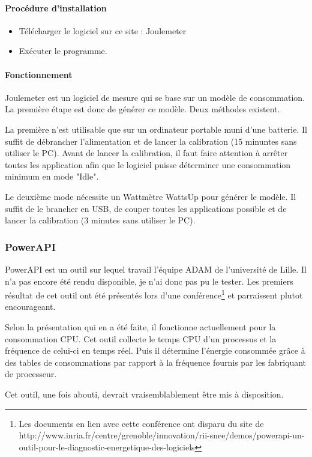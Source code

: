 \documentclass[a4paper, 11pt]{report}
\begin{document}
\paragraph{Procédure d'installation}
\begin{itemize}
	\item Télécharger le logiciel sur ce site : Joulemeter
	\item Exécuter le programme.
\end{itemize}

\paragraph{Fonctionnement}
Joulemeter est un logiciel de mesure qui se base sur un modèle de consommation. La première étape est donc de générer ce modèle. Deux méthodes existent.

La première n’est utilisable que sur un ordinateur portable muni d’une batterie. Il suffit de débrancher l’alimentation et de lancer la calibration (15 minuntes sans utiliser le PC). Avant de lancer la calibration, il faut faire attention à arrêter toutes les application afin que le logiciel puisse déterminer une consommation minimum en mode "Idle".

Le deuxième mode nécessite un Wattmètre WattsUp pour générer le modèle. Il suffit de le brancher en USB, de couper toutes les applications possible et de lancer la calibration (3 minutes sans utiliser le PC).

\subsubsection{PowerAPI}
PowerAPI est un outil sur lequel travail l'équipe ADAM de l'université de Lille. Il n'a pas encore été rendu disponible, je n'ai donc pas pu le tester. Les premiers résultat de cet outil ont été présentés lors d'une conférence\footnote{Les documents en lien avec cette conférence ont disparu du site de http://www.inria.fr/centre/grenoble/innovation/rii-snee/demos/powerapi-un-outil-pour-le-diagnostic-energetique-des-logiciels} et parraissent plutot encourageant.

Selon la présentation qui en a été faite, il fonctionne actuellement pour la consommation CPU. Cet outil collecte le temps CPU d'un processus et la fréquence de celui-ci en temps réel. Puis il détermine l'énergie consommée grâce à des tables de consommations par rapport à la fréquence fournis par les fabriquant de processeur.

Cet outil, une fois abouti, devrait vraisemblablement être mis à disposition.
\end{document}
